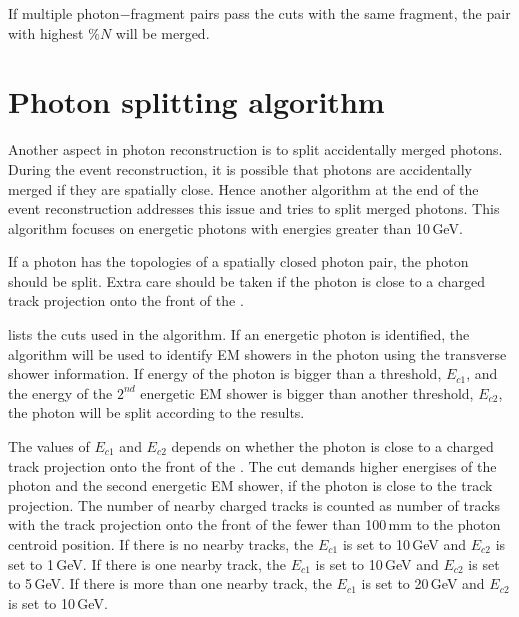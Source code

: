 If multiple photon$-$fragment pairs pass the cuts with the same fragment, the pair with highest $\%{N}$ will be merged.



\section{Photon splitting algorithm}
\label{sec:photonSplitting}


Another aspect in photon reconstruction is to split accidentally merged photons. During the event reconstruction, it is possible that photons are accidentally merged if they are spatially close. Hence another algorithm at the end of the event reconstruction addresses this issue and tries to split merged photons. This algorithm focuses on energetic photons with energies greater than 10\,GeV.

If a photon has the  topologies of a spatially closed photon pair, the photon should be split. Extra care should be taken if the photon is close to a charged track projection onto the front of the \ECAL.


 lists the cuts used in the algorithm.  If an energetic photon is identified, the \peakFinding algorithm will  be used to identify EM showers in the photon using the transverse shower information. If energy of the photon is bigger than a threshold, $E_{c1}$, and the energy of the $2^{nd}$ energetic EM shower is bigger than another threshold, $E_{c2}$, the photon will be split according to the \peakFinding results.

The values of $E_{c1}$ and $E_{c2}$ depends on whether the photon is close to a charged track projection onto the front of the \ECAL. The cut demands higher energises of the photon and the second energetic EM shower, if the photon is close to the track projection. The number of nearby charged tracks is counted as number of tracks with the track projection onto the front of the \ECAL fewer than 100\,mm to the photon centroid position. If there is no nearby tracks, the $E_{c1}$ is set to 10\,GeV and $E_{c2}$ is set to 1\,GeV. If there is one nearby track, the $E_{c1}$ is set to 10\,GeV and $E_{c2}$ is set to 5\,GeV. If there is more than one nearby track, the $E_{c1}$ is set to 20\,GeV and $E_{c2}$ is set to 10\,GeV.

